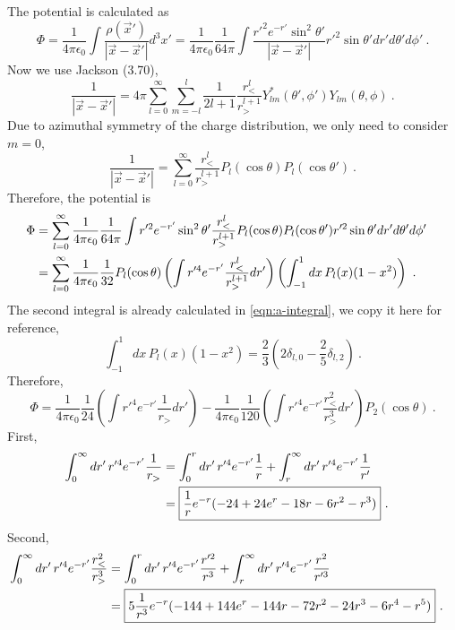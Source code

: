 \documentclass[12pt]{article}
\begin{document}
\newpage
The potential is calculated as
\begin{equation}
    \Phi = \frac{1}{4\pi \epsilon_0} \int \frac{\rho(\vec x')}{|\vec x - \vec x'|} d^3 x' = \frac{1}{4\pi \epsilon_0} \frac{1}{64 \pi} \int \frac{r'^2 e^{-r'}\sin^2\theta' }{|\vec x - \vec x'|} r'^2 \sin\theta' dr' d\theta' d\phi'~.
\end{equation}
Now we use Jackson (3.70),
\begin{equation}
    \frac{1}{|\vec x - \vec x'|} = 4\pi \sum_{l = 0}^\infty \sum_{m = -l}^l \frac{1}{2l+1} \frac{r^l_<}{r^{l+1}_>} Y_{lm}^*(\theta', \phi') Y_{lm}(\theta, \phi)~.
\end{equation}
Due to azimuthal symmetry of the charge distribution, we only need to consider $m = 0$,
\begin{equation}
    \boxed{
    \frac{1}{|\vec x - \vec x'|} = \sum_{l = 0}^\infty \frac{r^l_<}{r_>^{l+1}} P_l(\cos \theta) P_l(\cos \theta')~.
    }
\end{equation}
Therefore, the potential is
\begin{align}
    \Phi &= \sum_{l = 0}^\infty \frac{1}{4\pi \epsilon_0} \frac{1}{64\pi} \int r'^2 e^{-r'} \sin^2 \theta' \frac{r^l_<}{r_>^{l+1}} P_l(\cos \theta) P_l(\cos \theta')r'^2 \sin\theta' dr' d\theta' d\phi' \cr
    &= \sum_{l = 0}^\infty \frac{1}{4\pi \epsilon_0} \frac{1}{32}  P_l(\cos \theta) \left(\int r'^4 e^{-r'}  \frac{r^l_<}{r_>^{l+1}}  dr'\right)  \left(\int_{-1}^1 dx\, P_l(x) (1 - x^2)\right)~.
\end{align}
The second integral is already calculated in \eqref{eqn:a-integral}, we copy it here for reference,
\begin{equation}
    \int_{-1}^1 dx\, P_l(x)(1-x^2)  = \frac{2}{3} \left(2 \delta_{l,0} - \frac{2}{5} \delta_{l,2}\right)~.
\end{equation}
Therefore,
\begin{equation}
    \boxed{
    \Phi =  \frac{1}{4\pi \epsilon_0} \frac{1}{24} \left(\int r'^4 e^{-r'}  \frac{1}{r_>}  dr'\right) - \frac{1}{4\pi \epsilon_0} \frac{1}{120}\left(\int r'^4 e^{-r'}  \frac{r_<^2}{r_>^3} dr'\right) P_2(\cos \theta)~.
    }
\end{equation}
First,
\begin{align}
    \int_0^\infty  dr'\, r'^4 e^{-r'}  \frac{1}{r_>} &= \int_0^r dr'\, r'^4 e^{-r'} \frac{1}{r} + \int_{r}^{\infty} dr' \, r'^4 e^{-r'} \frac{1}{r'} \cr
    &= \boxed{\frac{1}{r} e^{-r} (-24 + 24 e^r - 18 r - 6 r^2 - r^3)}~.
\end{align}
Second,
\begin{align}
    \int_0^\infty dr'\, r'^4 e^{-r'}  \frac{r_<^2}{r_>^3} &= \int_0^r dr' \, r'^4 e^{-r'}  \frac{r'^2}{r^3} + \int_r^\infty dr' \, r'^4 e^{-r'}  \frac{r^2}{r'^3} \cr
    &= \boxed{5 \frac{1}{r^3}e^{-r}(-144 + 144 e^r - 144 r - 72 r^2 - 24 r^3 - 6r^4 - r^5)}~.
\end{align}
\end{document}
